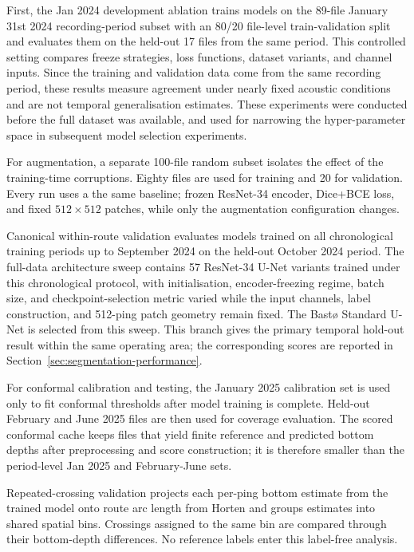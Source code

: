 First, the Jan 2024 development ablation trains models on the 89-file January 31st 2024 recording-period subset with an 80/20 file-level train-validation split and evaluates them on the held-out 17 files from the same period. This controlled setting compares freeze strategies, loss functions, dataset variants, and channel inputs. Since the training and validation data come from the same recording period, these results measure agreement under nearly fixed acoustic conditions and are not temporal generalisation estimates. These experiments were conducted before the full dataset was available, and used for narrowing the hyper-parameter space in subsequent model selection experiments.

For augmentation, a separate 100-file random subset isolates the effect of the training-time corruptions. Eighty files are used for training and 20 for validation. Every run uses a the same baseline; frozen ResNet-34 encoder, Dice+BCE loss, and fixed $512\times512$ patches, while only the augmentation configuration changes.

Canonical within-route validation evaluates models trained on all chronological training periods up to September 2024 on the held-out October 2024 period. The full-data architecture sweep contains 57 ResNet-34 U-Net variants trained under this chronological protocol, with initialisation, encoder-freezing regime, batch size, and checkpoint-selection metric varied while the input channels, label construction, and 512-ping patch geometry remain fixed. The Bast\o{} Standard U-Net is selected from this sweep. This branch gives the primary temporal hold-out result within the same operating area; the corresponding scores are reported in Section~\ref{sec:segmentation-performance}.

For conformal calibration and testing, the January 2025 calibration set is used only to fit conformal thresholds after model training is complete. Held-out February and June 2025 files are then used for coverage evaluation. The scored conformal cache keeps files that yield finite reference and predicted bottom depths after preprocessing and score construction; it is therefore smaller than the period-level Jan 2025 and February-June sets.

Repeated-crossing validation projects each per-ping bottom estimate from the trained model onto route arc length from Horten and groups estimates into shared spatial bins. Crossings assigned to the same bin are compared through their bottom-depth differences. No reference labels enter this label-free analysis.

